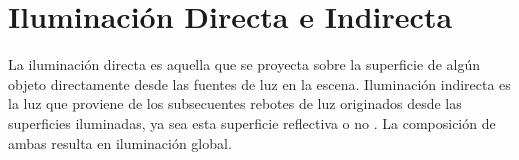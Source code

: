 \section{Iluminación Directa e Indirecta}
\label{sec:direct_indirect}
La iluminación directa es aquella que se proyecta sobre la superficie de algún objeto directamente desde las fuentes de luz en la escena. Iluminación indirecta es la luz que proviene de los subsecuentes rebotes de luz originados desde las superficies iluminadas, ya sea esta superficie reflectiva o no \cite{advanced_gi2006}. La composición de ambas resulta en iluminación global.